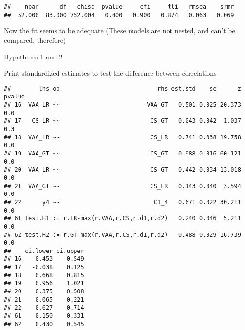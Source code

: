 \documentclass[
]{article}
\newenvironment{Shaded}{\begin{snugshade}}{\end{snugshade}}
\newcommand{\FloatTok}[1]{\textcolor[rgb]{0.00,0.00,0.81}{#1}}
\newcommand{\KeywordTok}[1]{\textcolor[rgb]{0.13,0.29,0.53}{\textbf{#1}}}
\newcommand{\NormalTok}[1]{#1}
\newcommand{\OperatorTok}[1]{\textcolor[rgb]{0.81,0.36,0.00}{\textbf{#1}}}
\newcommand{\StringTok}[1]{\textcolor[rgb]{0.31,0.60,0.02}{#1}}
\begin{document}
\begin{verbatim}
##    npar      df   chisq  pvalue     cfi     tli   rmsea    srmr 
##  52.000  83.000 752.004   0.000   0.900   0.874   0.063   0.069
\end{verbatim}

Now the fit seems to be adequate (These models are not nested, and can't
be compared, therefore)

Hypotheses 1 and 2

Print standardized estimates to test the difference between correlations

\begin{Shaded}
\end{Shaded}

\begin{verbatim}
##        lhs op                            rhs est.std    se      z pvalue
## 16  VAA_LR ~~                         VAA_GT   0.501 0.025 20.373    0.0
## 17   CS_LR ~~                          CS_GT   0.043 0.042  1.037    0.3
## 18  VAA_LR ~~                          CS_LR   0.741 0.038 19.758    0.0
## 19  VAA_GT ~~                          CS_GT   0.988 0.016 60.121    0.0
## 20  VAA_LR ~~                          CS_GT   0.442 0.034 13.018    0.0
## 21  VAA_GT ~~                          CS_LR   0.143 0.040  3.594    0.0
## 22      y4 ~~                           C1_4   0.671 0.022 30.211    0.0
## 61 test.H1 := r.LR-max(r.VAA,r.CS,r.d1,r.d2)   0.240 0.046  5.211    0.0
## 62 test.H2 := r.GT-max(r.VAA,r.CS,r.d1,r.d2)   0.488 0.029 16.739    0.0
##    ci.lower ci.upper
## 16    0.453    0.549
## 17   -0.038    0.125
## 18    0.668    0.815
## 19    0.956    1.021
## 20    0.375    0.508
## 21    0.065    0.221
## 22    0.627    0.714
## 61    0.150    0.331
## 62    0.430    0.545
\end{verbatim}
\end{document}
